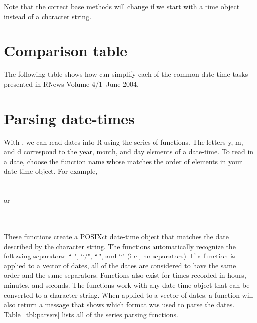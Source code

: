 \documentclass[article]{jss}
\begin{document}
Note that the correct base  methods will change if we start with a time object instead of a character string. 

\section{Comparison table}

The following table shows how  can simplify each of the common date time tasks presented in RNews Volume 4/1, June 2004.




\section{Parsing date-times}
\label{sec:parsing}

With , we can read dates into R using the  series of functions. The letters y, m, and d correspond to the year, month, and day elements of a date-time. To read in a date, choose the function name whose matches the order of elements in your date-time object. For example,\\

\\
\\

or

\\
\\


These functions create a POSIXct date-time object that matches the date described by the character string.  The functions automatically recognize the following separators: ``-", ``/", ``.", and ``" (i.e., no separators). If a  function is applied to a vector of dates, all of the dates are considered to have the same order and the same separators. Functions also exist for times recorded in hours, minutes, and seconds. The  functions work with any date-time object that can be converted to a character string. When applied to a vector of dates, a  function will also return a message that shows which format was used to parse the dates. Table~\ref{tbl:parsers} lists all of the  series parsing functions.
\end{document}
